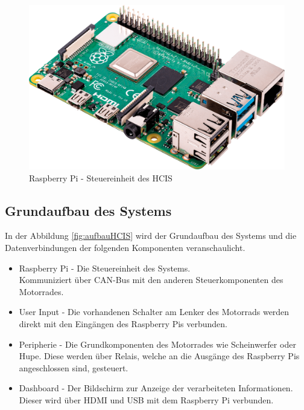 \begin{figure}[H]
	\begin{center}
		\includegraphics[scale=0.07]{figures/hcis/raspberryPi.png}
		\caption{Raspberry Pi - Steuereinheit des HCIS}
	\end{center}
\end{figure}

\subsection{Grundaufbau des Systems}

In der Abbildung \ref{fig:aufbauHCIS} wird der Grundaufbau des Systems und die Datenverbindungen der folgenden  Komponenten veranschaulicht.

\begin{itemize}
	
	\item Raspberry Pi - Die Steuereinheit des Systems.
	\\ Kommuniziert über CAN-Bus mit den anderen Steuerkomponenten des Motorrades.
	
	\item User Input - Die vorhandenen Schalter am Lenker des Motorrads werden direkt mit den Eingängen des Raspberry Pis verbunden. 
	
	\item Peripherie - Die Grundkomponenten des Motorrades wie Scheinwerfer oder Hupe. Diese werden über Relais, welche an die Ausgänge des Raspberry Pis angeschlossen sind, gesteuert.
	
	\item Dashboard - Der Bildschirm zur Anzeige der verarbeiteten Informationen. Dieser wird über HDMI und USB mit dem Raspberry Pi verbunden.
	
\end{itemize}

